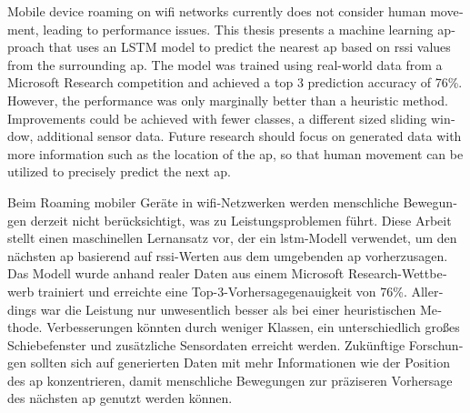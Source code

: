 \null\vfil
\begin{otherlanguage}{english}
\begin{center}\textsf{\textbf{\abstractname}}\end{center}

\noindent 
Mobile device roaming on \ac{wifi} networks currently does not consider human movement, leading to performance issues.
This thesis presents a machine learning approach that uses an LSTM model to predict the nearest \ac{ap} based on \ac{rssi} values from the surrounding \ac{ap}.
The model was trained using real-world data from a Microsoft Research competition and achieved a top 3 prediction accuracy of 76\%.
However, the performance was only marginally better than a heuristic method.
Improvements could be achieved with fewer classes, a different sized sliding window, additional sensor data.
Future research should focus on generated data with more information such as the location of the \ac{ap}, so that human movement can be utilized to precisely predict the next \ac{ap}.
\end{otherlanguage}
\vfil\null



\null\vfil
\begin{otherlanguage}{ngerman}
\begin{center}\textsf{\textbf{\abstractname}}\end{center}

\noindent 
Beim Roaming mobiler Geräte in \ac{wifi}-Netzwerken werden menschliche Bewegungen derzeit nicht berücksichtigt, was zu Leistungsproblemen führt.
Diese Arbeit stellt einen maschinellen Lernansatz vor, der ein \ac{lstm}-Modell verwendet, um den nächsten \ac{ap} basierend auf \ac{rssi}-Werten aus dem umgebenden \ac{ap} vorherzusagen.
Das Modell wurde anhand realer Daten aus einem Microsoft Research-Wettbewerb trainiert und erreichte eine Top-3-Vorhersagegenauigkeit von 76\%.
Allerdings war die Leistung nur unwesentlich besser als bei einer heuristischen Methode.
Verbesserungen könnten durch weniger Klassen, ein unterschiedlich großes Schiebefenster und zusätzliche Sensordaten erreicht werden.
Zukünftige Forschungen sollten sich auf generierten Daten mit mehr Informationen wie der Position des \ac{ap} konzentrieren, damit menschliche Bewegungen zur präziseren Vorhersage des nächsten \ac{ap} genutzt werden können.
\end{otherlanguage}
\vfil\null
